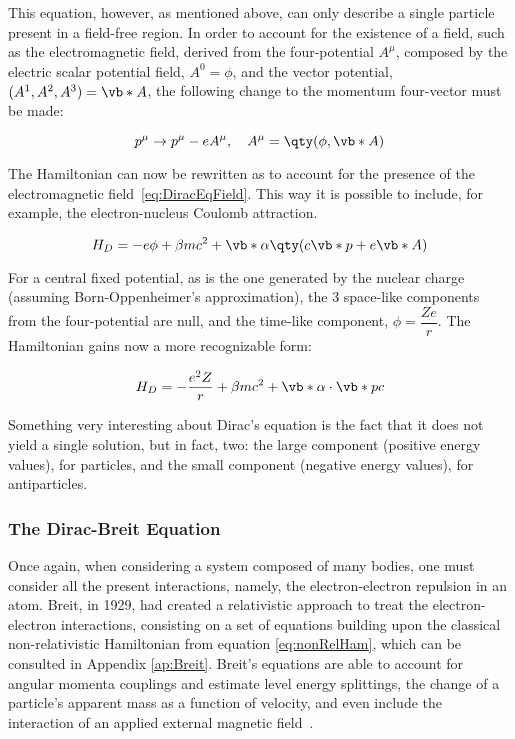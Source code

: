 This equation, however, as mentioned above, can only describe a single particle present in a field-free region. In order to account for the existence of a field, such as the electromagnetic field, derived from the four-potential $A^\mu$, composed by the electric scalar potential field, $A^0=\phi$, and the vector potential, $(A^1,A^2,A^3)=\vb*{A}$, the following change to the momentum four-vector must be made:


\begin{equation}
    p^\mu \rightarrow p^\mu - e A^\mu,\quad A^\mu = \qty(\phi,\vb*{A})
\end{equation}

The Hamiltonian can now be rewritten as to account for the presence of the electromagnetic field~\eqref{eq:DiracEqField}. This way it is possible to include, for example, the electron-nucleus Coulomb attraction.

\begin{equation}
    H_D=-e\phi + \beta m c^2 + \vb*{\alpha}\qty(c\vb*{p}+e\vb*{A})
    \label{eq:DiracEqField}
\end{equation}

For a central fixed potential, as is the one generated by the nuclear charge (assuming Born-Oppenheimer's approximation), the 3 space-like components from the four-potential are null, and the time-like component, $\phi=\dfrac{Z e}{r}$. The Hamiltonian gains now a more recognizable form:

\begin{equation}
    H_D=-\frac{e^2 Z}{r} + \beta m c^2 + \vb*{\alpha}\cdot\vb*{p}c
    \label{eq:diracHam}
\end{equation}

Something very interesting about Dirac's equation is the fact that it does not yield a single solution, but in fact, two: the large component (positive energy values), for particles, and the small component (negative energy values), for antiparticles.

\subsubsection{The Dirac-Breit Equation}

Once again, when considering a system composed of many bodies, one must consider all the present interactions, namely, the electron-electron repulsion in an atom.
 Breit, in 1929, had created a relativistic approach to treat the electron-electron interactions, consisting on a set of equations building upon the classical non-relativistic Hamiltonian from equation \eqref{eq:nonRelHam}, which can be consulted in Appendix \ref{ap:Breit}.
  Breit's equations are able to account for angular momenta couplings and estimate level energy splittings, the change of a particle's apparent mass as a function of velocity, and even include the interaction of an applied external magnetic field~\cite{Bethe1977}.

